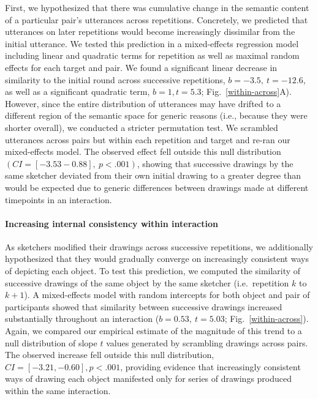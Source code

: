 First, we hypothesized that there was cumulative change in the semantic content of a particular pair's utterances across repetitions.
Concretely, we predicted that utterances on later repetitions would become increasingly dissimilar from the initial utterance.
We tested this prediction in a mixed-effects regression model including linear and quadratic terms for repetition as well as maximal random effects for each target and pair.
We found a significant linear decrease in similarity to the initial round across successive repetitions, $b = -3.5,~t = -12.6$, as well as a significant quadratic term, $b=1, t=5.3$; Fig.~\ref{within-across}A).
However, since the entire distribution of utterances may have drifted to a different region of the semantic space for generic reasons (i.e., because they were shorter overall), we conducted a stricter permutation test.
We scrambled utterances across pairs but within each repetition and target and re-ran our mixed-effects model.
The observed effect fell outside this null distribution $(CI= [-3.53 -0.88], ~p < .001)$, showing that successive drawings by the same sketcher deviated from their own initial drawing to a greater degree than would be expected due to generic differences between drawings made at different timepoints in an interaction.

\paragraph{Increasing internal consistency within interaction}

As sketchers modified their drawings across successive repetitions, we additionally hypothesized that they would gradually converge on increasingly consistent ways of depicting each object.
To test this prediction, we computed the similarity of successive drawings of the same object by the same sketcher (i.e.~repetition $k$ to $k+1$). %
A mixed-effects model with random intercepts for both object and pair of participants showed that similarity between successive drawings increased substantially throughout an interaction ($b = 0.53,~t = 5.03$; Fig.~\ref{within-across}).
Again, we compared our empirical estimate of the magnitude of this trend to a null distribution of slope $t$ values generated by scrambling drawings across pairs.%
The observed increase fell outside this null distribution, $CI = [-3.21, -0.60], p < .001$, providing evidence that increasingly consistent ways of drawing each object manifested only for series of drawings produced within the same interaction.

